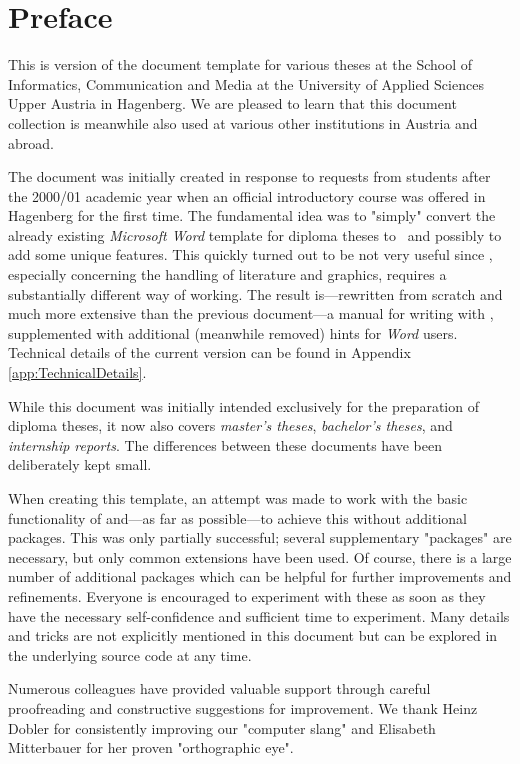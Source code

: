 \chapter{Preface} %

This is version \textbf{\hgbDate} of the \latex document template for various
theses at the School of Informatics, Communication and Media at the University
of Applied Sciences Upper Austria in Hagenberg. We are pleased to learn that this
document collection is meanwhile also used at various other institutions in Austria
and abroad.

The document was initially created in response to requests from students after
the 2000/01 academic year when an official \latex introductory course was
offered in Hagenberg for the first time. The fundamental idea was to
"simply" convert the already existing \emph{Microsoft Word} template for
diploma theses to \latex\ and possibly to add some unique features. This quickly
turned out to be not very useful since \latex, especially concerning the
handling of literature and graphics, requires a substantially different way of
working. The result is---rewritten from scratch and much more extensive than
the previous document---a manual for writing with \latex, supplemented with
additional (meanwhile removed) hints for \emph{Word} users. Technical details
of the current version can be found in Appendix \ref{app:TechnicalDetails}.

While this document was initially intended exclusively for the preparation
of diploma theses, it now also covers \emph{master's theses},
\emph{bachelor's theses}, and \emph{internship reports}. The differences between
these documents have been deliberately kept small.


When creating this template, an attempt was made to work with the basic
functionality of \latex and---as far as possible---to achieve this without
additional packages. This was only partially successful; several supplementary
"packages" are necessary, but only common extensions have been used. Of course,
there is a large number of additional packages which can be helpful for further
improvements and refinements. Everyone is encouraged to experiment with these as
soon as they have the necessary self-confidence and sufficient time to
experiment. Many details and tricks are not explicitly mentioned in this
document but can be explored in the underlying source code at any time.

Numerous colleagues have provided valuable support through careful proofreading
and constructive suggestions for improvement. We thank Heinz Dobler for
consistently improving our "computer slang" and Elisabeth Mitterbauer for her
proven "orthographic eye".


